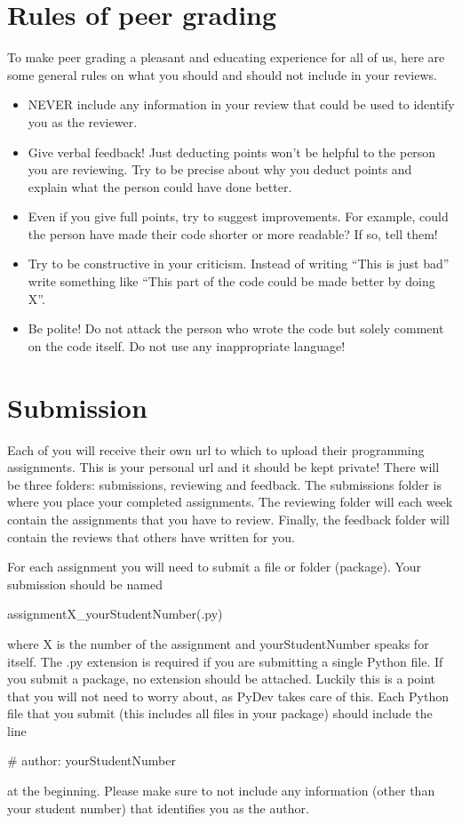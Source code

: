 \documentclass[a4paper, leqno, 11pt]{article}
\begin{document}
\section{Rules of peer grading}
To make peer grading a pleasant and educating experience for all of us, here are some general rules on what you should and should
not include in your reviews.
\begin{itemize}
\item NEVER include any information in your review that could be used to identify you as the reviewer.
\item Give verbal feedback! Just deducting points won't be helpful to the person you are reviewing. Try to be precise about why
you deduct points and explain what the person could have done better.
\item Even if you give full points, try to suggest improvements. For example, could the person have made their code shorter or more
readable? If so, tell them!
\item Try to be constructive in your criticism. Instead of writing ``This is just bad'' write something like ``This part of the code
could be made better by doing X''.
\item Be polite! Do not attack the person who wrote the code but solely comment on the code itself. Do not use any inappropriate language!
\end{itemize}

\section{Submission} \label{submission}
Each of you will receive their own url to which to upload their programming assignments. This is your personal url and it should
be kept private! There will be three folders: submissions, reviewing and feedback. The submissions folder is where you place your
completed assignments. The reviewing folder will each week contain the assignments that you have to review. Finally, the feedback
folder will contain the reviews that others have written for you.

For each assignment you will need to submit a file or folder (package). Your submission should be named
\begin{center}
assignmentX\_yourStudentNumber(.py)
\end{center}
where X is the number of the assignment and yourStudentNumber speaks for itself. The .py extension is required if you are submitting a
single Python file. If you submit a package, no extension should be attached. Luckily this is a point that you will not need 
to worry about, as PyDev takes care of this. Each Python file that you submit (this includes all files in your package) should
include the line
\begin{center}
\# author: yourStudentNumber
\end{center}
at the beginning. Please make sure to not include any information (other than your student number) that identifies you as the author.
\end{document}
